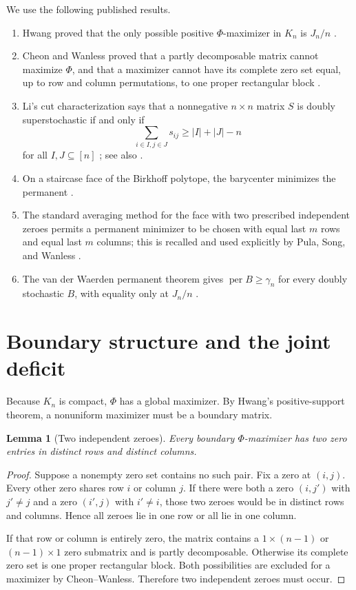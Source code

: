 \documentclass[11pt]{article}
\newtheorem{lemma}[theorem]{Lemma}
\theoremstyle{remark}
\newcommand{\per}{\operatorname{per}}
\newcommand{\PhiD}{\Phi}
\begin{document}
We use the following published results.
\begin{enumerate}
\item Hwang proved that the only possible positive $\PhiD$-maximizer in $K_n$ is $J_n/n$ \cite{Hwang1986}.
\item Cheon and Wanless proved that a partly decomposable matrix cannot maximize $\PhiD$, and that a maximizer cannot have its complete zero set equal, up to row and column permutations, to one proper rectangular block \cite[Theorems 3.2 and 3.7]{CheonWanless2012}.
\item Li's cut characterization says that a nonnegative $n\times n$ matrix $S$ is doubly superstochastic if and only if
\[
 \sum_{i\in I,j\in J}s_{ij}\ge |I|+|J|-n
\]
for all $I,J\subseteq[n]$ \cite{Li1990}; see also \cite[Lemma 2.2]{CheonWanless2012}.
\item On a staircase face of the Birkhoff polytope, the barycenter minimizes the permanent \cite{Hwang1985}.
\item The standard averaging method for the face with two prescribed independent zeroes permits a permanent minimizer to be chosen with equal last $m$ rows and equal last $m$ columns; this is recalled and used explicitly by Pula, Song, and Wanless \cite[Section 2]{PulaSongWanless2011}.
\item The van der Waerden permanent theorem gives $\per B\ge\gamma_n$ for every doubly stochastic $B$, with equality only at $J_n/n$ \cite{Egorychev1981,Falikman1981}.
\end{enumerate}

\section{Boundary structure and the joint deficit}
Because $K_n$ is compact, $\PhiD$ has a global maximizer. By Hwang's positive-support theorem, a nonuniform maximizer must be a boundary matrix.

\begin{lemma}[Two independent zeroes]\label{lem:independent-zeros}
Every boundary $\PhiD$-maximizer has two zero entries in distinct rows and distinct columns.
\end{lemma}
\begin{proof}
Suppose a nonempty zero set contains no such pair. Fix a zero at $(i,j)$. Every other zero shares row $i$ or column $j$. If there were both a zero $(i,j')$ with $j'\ne j$ and a zero $(i',j)$ with $i'\ne i$, those two zeroes would be in distinct rows and columns. Hence all zeroes lie in one row or all lie in one column.

If that row or column is entirely zero, the matrix contains a $1\times(n-1)$ or $(n-1)\times1$ zero submatrix and is partly decomposable. Otherwise its complete zero set is one proper rectangular block. Both possibilities are excluded for a maximizer by Cheon--Wanless. Therefore two independent zeroes must occur.
\end{proof}
\end{document}
